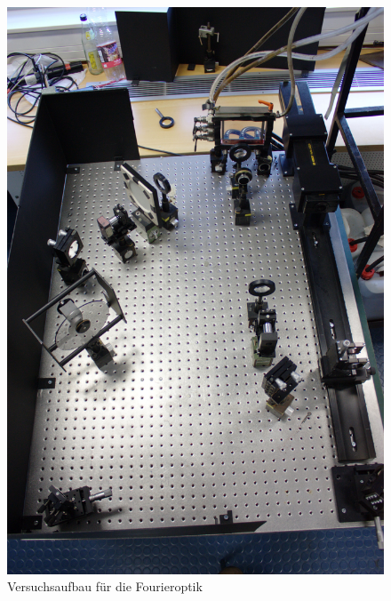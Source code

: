 \begin{figure}[H]
 \includegraphics[height=0.5\textheight]{Photos/IMG_3941.jpg}
 \caption{Versuchsaufbau für die Fourieroptik}
 \label{fourier_bild}
\end{figure}

